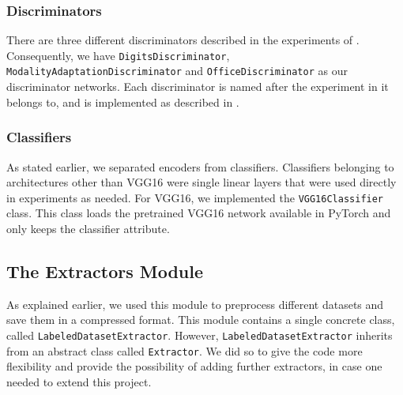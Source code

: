 \documentclass[14pt]{extarticle}
\begin{document}
		\subsubsection{Discriminators}
		There are three different discriminators described in the experiments of \cite{adda}. Consequently, we have \texttt{DigitsDiscriminator},  \texttt{ModalityAdaptationDiscriminator} and \texttt{OfficeDiscriminator} as our discriminator networks. Each discriminator is named after the experiment in \cite{adda} it belongs to, and is implemented as described in \cite{adda}.
		\subsubsection{Classifiers}
		As stated earlier, we separated encoders from classifiers. Classifiers belonging to architectures other than VGG16 were single linear layers that were used directly in experiments as needed. For VGG16, we implemented the \texttt{VGG16Classifier} class. This class loads the pretrained VGG16 network available in PyTorch and only keeps the classifier attribute.
		\subsection{The Extractors Module}
		As explained earlier, we used this module to preprocess different datasets and save them in a compressed format. This module contains a single concrete class, called \texttt{LabeledDatasetExtractor}. However, \texttt{LabeledDatasetExtractor} inherits from an abstract class called \texttt{Extractor}. We did so to give the code more flexibility and provide the possibility of adding further extractors, in case one needed to extend this project.
\end{document}
